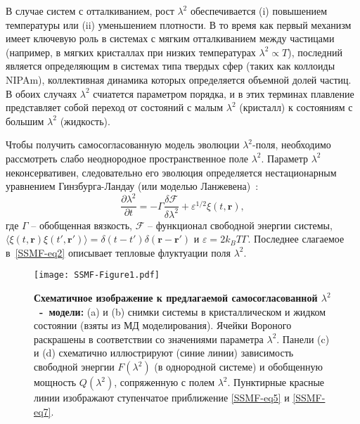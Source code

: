 В случае систем с отталкиванием, рост $\lambda^2$ обеспечивается (i) повышением температуры или (ii) уменьшением плотности.
В то время как первый механизм имеет ключевую роль в системах с мягким отталкиванием между частицами (например, в мягких кристаллах при низких температурах $\lambda^2\propto T $), последний является определяющим в системах типа твердых сфер (таких как коллоиды NIPAm), коллективная динамика которых определяется объемной долей частиц.
В обоих случаях $\lambda^2$ счиатется параметром порядка, и в этих терминах плавление представляет собой переход от состояний с малым $\lambda^2$ (кристалл) к состояниям с большим $\lambda^2$ (жидкость).

Чтобы получить самосогласованную модель эволюции $ \lambda^2$-поля,
необходимо рассмотреть слабо неоднородное пространственное поле $\lambda^2$.
Параметр $\lambda ^ 2$ неконсервативен, следовательно его эволюция определяется нестационарным уравнением Гинзбурга-Ландау (или моделью Ланжевена)~\cite{book.desai}:
\begin{equation}
  \label{SSMF-eq4}
  \frac{\partial \lambda^2}{\partial t} = -\Gamma \frac{\delta \mathcal{F}}{\delta \lambda^2} + \varepsilon^{1/2}\xi(t,\mathbf{r}),
\end{equation}
где $\Gamma$ -- обобщенная вязкость, $ \mathcal{F} $ -- функционал свободной энергии системы, $\langle \xi(t,\mathbf{r})\xi(t',\mathbf{r}')\rangle = \delta(t-t')\delta(\mathbf{r}-\mathbf{r}')$ и $\varepsilon = 2k_BT\Gamma$.
Последнее слагаемое в~\eqref{SSMF-eq2} описывает тепловые флуктуации поля $\lambda^2$.

\begin{figure}[!t]
  \centering
  \texttt{[image: SSMF-Figure1.pdf]}
  \caption{\textbf{Схематичное изображение к предлагаемой самосогласованной $\lambda^2$~-~модели:}
    (a) и (b) снимки системы в кристаллическом и жидком состоянии (взяты из МД моделирования).
    Ячейки Вороного раскрашены в соответствии со значениями параметра $ \lambda^2$.
    Панели (c) и (d) схематично иллюстрируют (синие линии) зависимость свободной энергии $ F (\lambda ^ 2) $ (в однородной системе) и обобщенную мощность $ Q (\lambda ^ 2) $, сопряженную с полем $\lambda^2$.
    Пунктирные красные линии изображают ступенчатое приближение \eqref{SSMF-eq5} и \eqref{SSMF-eq7}.
  }
  \label{SSMF-Figure1}
\end{figure}


